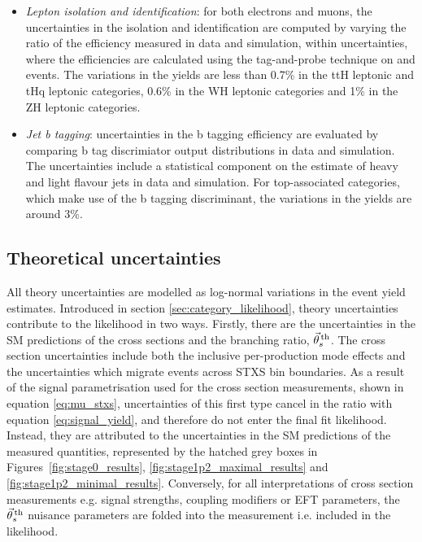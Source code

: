 \begin{itemize}
    \item \textit{Lepton isolation and identification}: for both electrons and muons, the uncertainties in the isolation and identification are computed by varying the ratio of the efficiency measured in data and simulation, within uncertainties, where the efficiencies are calculated using the tag-and-probe technique on \Zee and \Zmumu events. The variations in the yields are less than 0.7\% in the ttH leptonic and tHq leptonic categories, 0.6\% in the WH leptonic categories and 1\% in the ZH leptonic categories. 
    
    \item \textit{Jet b tagging}: uncertainties in the b tagging efficiency are evaluated by comparing b tag discrimiator output distributions in data and simulation. The uncertainties include a statistical component on the estimate of heavy and light flavour jets in data and simulation. For top-associated categories, which make use of the b tagging discriminant, the variations in the yields are around 3\%.
\end{itemize}

\subsection{Theoretical uncertainties}\label{sec:systematics_theoretical}
All theory uncertainties are modelled as log-normal variations in the event yield estimates. Introduced in section \ref{sec:category_likelihood}, theory uncertainties contribute to the likelihood in two ways. Firstly, there are the uncertainties in the SM predictions of the cross sections and the \hgg branching ratio, $\vec{\theta}^{\,\rm{th}}_{s}$. The cross section uncertainties include both the inclusive per-production mode effects and the uncertainties which migrate events across STXS bin boundaries. As a result of the signal parametrisation used for the cross section measurements, shown in equation \ref{eq:mu_stxs}, uncertainties of this first type cancel in the ratio with equation \ref{eq:signal_yield}, and therefore do not enter the final fit likelihood. Instead, they are attributed to the uncertainties in the SM predictions of the measured quantities, represented by the hatched grey boxes in Figures~\ref{fig:stage0_results}, \ref{fig:stage1p2_maximal_results} and \ref{fig:stage1p2_minimal_results}. Conversely, for all interpretations of cross section measurements e.g. signal strengths, coupling modifiers or EFT parameters, the $\vec{\theta}^{\,\rm{th}}_{s}$ nuisance parameters are folded into the measurement i.e. included in the likelihood.

